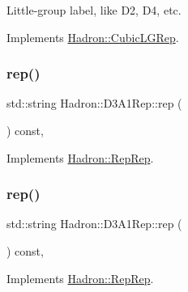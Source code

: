 Little-\/group label, like D2, D4, etc. 

Implements \mbox{\hyperlink{structHadron_1_1CubicLGRep_a9bdb14b519a611d21379ed96a3a9eb41}{Hadron\+::\+Cubic\+L\+G\+Rep}}.

\mbox{\label{structHadron_1_1D3A1Rep_aa6bbeffd53b5c6efd58e5269da0779b2}} 
\subsubsection{\texorpdfstring{rep()}{rep()}\hspace{0.1cm}{\footnotesize\ttfamily [1/5]}}
{\footnotesize\ttfamily std\+::string Hadron\+::\+D3\+A1\+Rep\+::rep (\begin{DoxyParamCaption}{ }\end{DoxyParamCaption}) const\hspace{0.3cm}{\ttfamily [inline]}, {\ttfamily [virtual]}}



Implements \mbox{\hyperlink{structHadron_1_1RepRep_ab3213025f6de249f7095892109575fde}{Hadron\+::\+Rep\+Rep}}.

\mbox{\label{structHadron_1_1D3A1Rep_aa6bbeffd53b5c6efd58e5269da0779b2}} 
\subsubsection{\texorpdfstring{rep()}{rep()}\hspace{0.1cm}{\footnotesize\ttfamily [2/5]}}
{\footnotesize\ttfamily std\+::string Hadron\+::\+D3\+A1\+Rep\+::rep (\begin{DoxyParamCaption}{ }\end{DoxyParamCaption}) const\hspace{0.3cm}{\ttfamily [inline]}, {\ttfamily [virtual]}}



Implements \mbox{\hyperlink{structHadron_1_1RepRep_ab3213025f6de249f7095892109575fde}{Hadron\+::\+Rep\+Rep}}.

\mbox{\label{structHadron_1_1D3A1Rep_aa6bbeffd53b5c6efd58e5269da0779b2}} 
